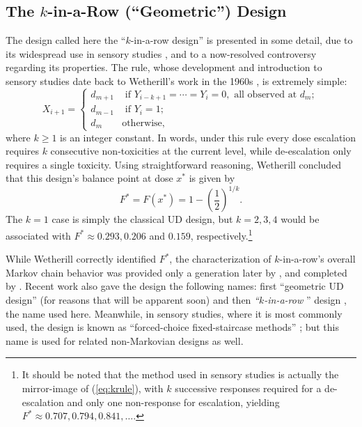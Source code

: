 \subsection{The $k$-in-a-Row (``Geometric'') Design}\label{sec:kr}

The design called here the ``$k$-in-a-row design'' is presented in some detail, due to its widespread use in sensory studies  \citep{Treu:Mini:1995}, and to a now-resolved controversy regarding its properties.  The rule, whose development and introduction to sensory studies date back to Wetherill's work in the 1960s  \citep{Weth:Sequ:1963,Weth:Levi:Sequ:1966}, is extremely simple:
%
\begin{equation}\label{eq:krule}
 X_{i+1}=
 \begin{cases}
d_{m+1} &\textrm{ if $Y_{i-k+1}=\cdots=Y_i=0$}, \textrm{ all observed at $d_m$};\\
d_{m-1} &\textrm{ if $Y_i=1$}; \\
d_m &\textrm{otherwise},
 \end{cases}
\end{equation}
\noindent where $k\geq 1$ is an integer constant. In words, under this rule every dose escalation requires $k$ consecutive non-toxicities at the current level, while de-escalation only requires a single toxicity. Using straightforward reasoning, Wetherill concluded that this design's balance point at dose $x^*$ is given by
%
\begin{equation}\label{eq:krtarget}
 F^*=F\left(x^*\right)=1-\left(\frac {1}{2}\right)^{1/k}.
\end{equation}
%
\noindent The $k=1$ case is simply the classical UD design, but $k=2,3,4$ would be associated with $F^*\approx 0.293,0.206$ and $0.159$, respectively.\footnote{It should be noted that the method used in sensory studies is actually the mirror-image of (\ref{eq:krule}), with $k$ successive responses required for a de-escalation and only one non-response for escalation, yielding $F^*\approx 0.707,0.794,0.841,\ldots$.}

While Wetherill correctly identified $F^*$, the characterization of $k$-in-a-row's overall Markov chain behavior was provided only a generation later by \cite{Gezm:Geom:1996}, and completed by \cite{Oron:Hoff:thek:2009}. Recent work also gave the design the following names: first ``geometric UD design'' (for reasons that will be apparent soon) and then \emph{``$k$-in-a-row} '' design \citep{Ivan:Mont:Moha:Durh:impr:2003}, the name used here. Meanwhile, in sensory studies, where it is most commonly used, the design is known as ``forced-choice fixed-staircase methods'' \citep{Treu:Mini:1995}; but this name is used for related non-Markovian designs as well.

